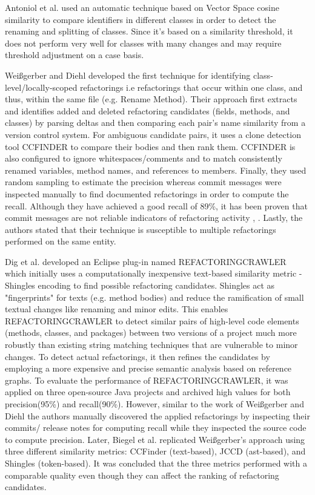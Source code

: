 \documentclass[letterpaper,12pt,onecolumn,final]{report}
\begin{document}
Antoniol et al. \cite{Antoniol2004} used an automatic technique based on Vector Space cosine similarity to compare identifiers in different classes in order to detect the renaming and splitting of classes. Since it's based on a similarity threshold, it does not perform very well for classes with many changes and may require threshold adjustment on a case basis.

Weißgerber and Diehl \cite{Weissgerber2006} developed the first technique for identifying class-level/locally-scoped refactorings i.e refactorings that occur within one class, and thus, within the same file (e.g. Rename Method). Their approach first extracts and identifies added and deleted refactoring candidates (fields, methods, and classes) by parsing deltas and then comparing each pair's name similarity from a version control system. For ambiguous candidate pairs, it uses a clone detection tool CCFINDER \cite{Kamiya2002} to compare their bodies and then rank them. CCFINDER is also configured to ignore whitespaces/comments and to match consistently renamed variables, method names, and references to members. Finally, they used random sampling to estimate the precision whereas commit messages were inspected manually to find documented refactorings in order to compute the recall. Although they have achieved a good recall of 89\%, it has been proven that commit messages are not reliable indicators of refactoring activity \cite{Krasniqi2020}, \cite{MurphyHill2012}. Lastly, the authors stated that their technique is susceptible to multiple refactorings performed on the same entity.


Dig et al. \cite{Dig2006} developed an Eclipse plug-in named REFACTORINGCRAWLER which initially uses a computationally inexpensive text-based similarity metric - Shingles encoding \cite{Broder1997} to find possible refactoring candidates. Shingles act as "fingerprints" for texts (e.g. method bodies) and reduce the ramification of small textual changes like renaming and minor edits. This enables REFACTORINGCRAWLER to detect similar pairs of high-level code elements (methods, classes, and packages) between two versions of a project much more robustly than existing string matching techniques that are vulnerable to minor changes. To detect actual refactorings, it then refines the candidates by employing a more expensive and precise semantic analysis based on reference graphs. To evaluate the performance of REFACTORINGCRAWLER, it was applied on three open-source Java projects and archived high values for both precision(95\%) and recall(90\%). However, similar to the work of Weißgerber and Diehl \cite{Weissgerber2006} the authors manually discovered the applied refactorings by inspecting their commits/ release notes for computing recall while they inspected the source code to compute precision. Later, Biegel et al. \cite{Biegel2011} replicated Weißgerber’s approach using three different similarity metrics: CCFinder (text-based), JCCD \cite{Biegel2010} (ast-based), and Shingles (token-based). It was concluded that the three metrics performed with a comparable quality even though they can affect the ranking of refactoring candidates.
\end{document}

